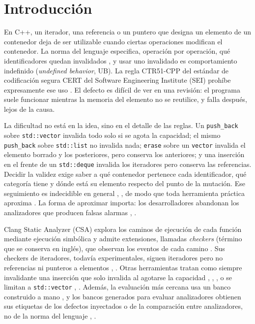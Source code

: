 \documentclass[conference]{IEEEtran}
\newcommand{\code}[1]{\texttt{#1}}
\begin{document}
\section{Introducción}

En C++, un iterador, una referencia o un puntero que designa un elemento de un contenedor deja de ser utilizable cuando ciertas operaciones modifican el contenedor. La norma del lenguaje especifica, operación por operación, qué identificadores quedan invalidados \cite{iso17}, y usar uno invalidado es comportamiento indefinido (\textit{undefined behavior}, UB). La regla CTR51-CPP del estándar de codificación segura CERT del Software Engineering Institute (SEI) prohíbe expresamente ese uso \cite{cert}. El defecto es difícil de ver en una revisión: el programa suele funcionar mientras la memoria del elemento no se reutilice, y falla después, lejos de la causa.

La dificultad no está en la idea, sino en el detalle de las reglas. Un \code{push\_back} sobre \code{std::vector} invalida todo solo si se agota la capacidad; el mismo \code{push\_back} sobre \code{std::list} no invalida nada; \code{erase} sobre un \code{vector} invalida el elemento borrado y los posteriores, pero conserva los anteriores; y una inserción en el frente de un \code{std::deque} invalida los iteradores pero conserva las referencias. Decidir la validez exige saber a qué contenedor pertenece cada identificador, qué categoría tiene y dónde está su elemento respecto del punto de la mutación. Ese seguimiento es indecidible en general \cite{landi92}, \cite{ramalingam94}, de modo que toda herramienta práctica aproxima \cite{livshits15}. La forma de aproximar importa: los desarrolladores abandonan los analizadores que producen falsas alarmas \cite{christakis16}, \cite{guo23}.

Clang Static Analyzer (CSA) explora los caminos de ejecución de cada función mediante ejecución simbólica \cite{king76} y admite extensiones, llamadas \textit{checkers} (término que se conserva en inglés), que observan los eventos de cada camino \cite{csadev}. Sus checkers de iteradores, todavía experimentales, siguen iteradores pero no referencias ni punteros a elementos \cite{csadoc}, \cite{balogh18}. Otras herramientas tratan como siempre invalidante una inserción que solo invalida al agotarse la capacidad \cite{saxena26}, \cite{infer}, \cite{cppcheck}, o se limitan a \code{std::vector} \cite{infer}, \cite{liu25}. Además, la evaluación más cercana usa un banco construido a mano \cite{liu25}, y los bancos generados para evaluar analizadores obtienen sus etiquetas de los defectos inyectados o de la comparación entre analizadores, no de la norma del lenguaje \cite{kashyap19}, \cite{klinger19}.
\end{document}
